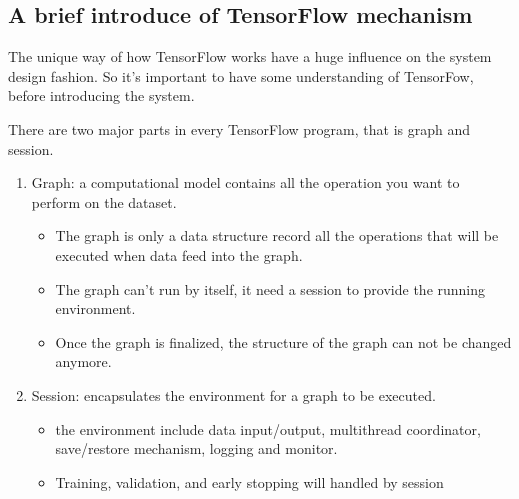\subsection{A brief introduce of TensorFlow mechanism}
The unique way of how TensorFlow works have a huge influence on the system design fashion. So it's important to have some understanding of TensorFow, before introducing the system. \par
There are two major parts in every TensorFlow program, that is graph and session.
\begin{enumerate}
   \item Graph: a computational model contains all the operation you want to perform on the dataset.
   \begin{itemize}
     \item The graph is only a data structure record all the operations that will be executed when data feed into the graph. 
     \item The graph can't run by itself, it need a session to provide the running environment.
     \item Once the graph is finalized, the structure of the graph can not be changed anymore.
   \end{itemize}
   \item Session: encapsulates the environment for a graph to be executed.
   \begin{itemize}
       \item the environment include data input/output, multithread coordinator, save/restore mechanism, logging and monitor. 
       \item Training, validation, and early stopping will handled by session
   \end{itemize}
\end{enumerate}


